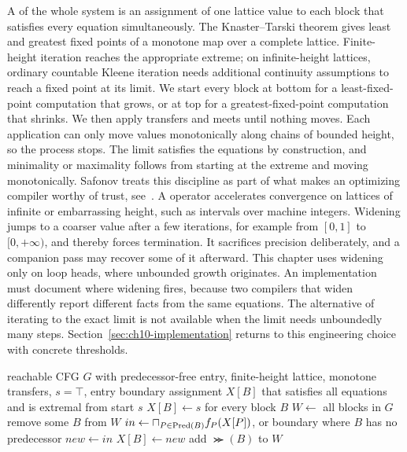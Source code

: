 A  of the whole system is an assignment of one lattice value to each block that satisfies every equation simultaneously.
The Knaster--Tarski theorem gives least and greatest fixed points of a monotone map over a complete lattice.
Finite-height iteration reaches the appropriate extreme; on infinite-height lattices, ordinary countable Kleene iteration needs additional continuity assumptions to reach a fixed point at its limit.
We start every block at bottom for a least-fixed-point computation that grows, or at top for a greatest-fixed-point computation that shrinks.
We then apply transfers and meets until nothing moves.
Each application can only move values monotonically along chains of bounded height, so the process stops.
The limit satisfies the equations by construction, and minimality or maximality follows from starting at the extreme and moving monotonically.
Safonov treats this discipline as part of what makes an optimizing compiler worthy of trust, see~\cite{safonov-2010-trustworthy}.
A  operator accelerates convergence on lattices of infinite or embarrassing height, such as intervals over machine integers.
Widening jumps to a coarser value after a few iterations, for example from $[0,1]$ to $[0, +\infty)$, and thereby forces termination.
It sacrifices precision deliberately, and a companion  pass may recover some of it afterward.
This chapter uses widening only on loop heads, where unbounded growth originates.
An implementation must document where widening fires, because two compilers that widen differently report different facts from the same equations.
The alternative of iterating to the exact limit is not available when the limit needs unboundedly many steps.
Section~\ref{sec:ch10-implementation} returns to this engineering choice with concrete thresholds.

\begin{algorithm}
\caption{Generic lattice fixed-point iteration with a worklist}\label{alg:ch10-fixedpoint}
\begin{pseudocode}
\Require reachable CFG $G$ with predecessor-free entry, finite-height lattice, monotone transfers, $s=\top$, entry boundary
\Ensure assignment $X[B]$ that satisfies all equations and is extremal from start $s$
\State $X[B] \gets s$ for every block $B$
\State $W \gets$ all blocks in $G$
\State remove some $B$ from $W$
\State $in \gets \sqcap_{P \in \operatorname{Pred}(B)} f_{P}(X[P])$, or boundary where $B$ has no predecessor
\State $new \gets in$
\State $X[B] \gets new$
\State add $\Succ(B)$ to $W$
\EndIf
\EndWhile
\end{pseudocode}
\end{algorithm}

